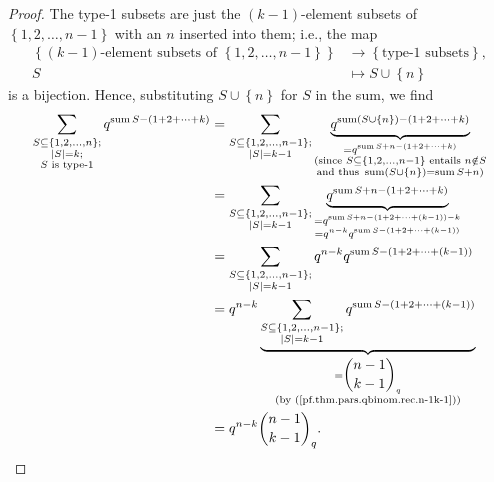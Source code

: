 \begin{proof}
The type-1 subsets are just the $\left(  k-1\right)  $-element subsets of
$\left\{  1,2,\ldots,n-1\right\}  $ with an $n$ inserted into them; i.e., the
map%
\begin{align*}
\left\{  \left(  k-1\right)  \text{-element subsets of }\left\{
1,2,\ldots,n-1\right\}  \right\}   &  \rightarrow\left\{  \text{type-1
subsets}\right\}  ,\\
S  &  \mapsto S\cup\left\{  n\right\}
\end{align*}
is a bijection. Hence, substituting $S\cup\left\{  n\right\}  $ for $S$ in the
sum, we find%
\begin{align*}
\sum_{\substack{S\subseteq\left\{  1,2,\ldots,n\right\}  ;\\\left\vert
S\right\vert =k;\\S\text{ is type-1}}}q^{\operatorname*{sum}S-\left(
1+2+\cdots+k\right)  }  &  =\sum_{\substack{S\subseteq\left\{  1,2,\ldots
,n-1\right\}  ;\\\left\vert S\right\vert =k-1}%
}\underbrace{q^{\operatorname*{sum}\left(  S\cup\left\{  n\right\}  \right)
-\left(  1+2+\cdots+k\right)  }}_{\substack{=q^{\operatorname*{sum}S+n-\left(
1+2+\cdots+k\right)  }\\\text{(since }S\subseteq\left\{  1,2,\ldots
,n-1\right\}  \text{ entails }n\notin S\\\text{and thus }\operatorname*{sum}%
\left(  S\cup\left\{  n\right\}  \right)  =\operatorname*{sum}S+n\text{)}}}\\
&  =\sum_{\substack{S\subseteq\left\{  1,2,\ldots,n-1\right\}  ;\\\left\vert
S\right\vert =k-1}}\underbrace{q^{\operatorname*{sum}S+n-\left(
1+2+\cdots+k\right)  }}_{\substack{=q^{\operatorname*{sum}S+n-\left(
1+2+\cdots+\left(  k-1\right)  \right)  -k}\\=q^{n-k}q^{\operatorname*{sum}%
S-\left(  1+2+\cdots+\left(  k-1\right)  \right)  }}}\\
&  =\sum_{\substack{S\subseteq\left\{  1,2,\ldots,n-1\right\}  ;\\\left\vert
S\right\vert =k-1}}q^{n-k}q^{\operatorname*{sum}S-\left(  1+2+\cdots+\left(
k-1\right)  \right)  }\\
&  =q^{n-k}\underbrace{\sum_{\substack{S\subseteq\left\{  1,2,\ldots
,n-1\right\}  ;\\\left\vert S\right\vert =k-1}}q^{\operatorname*{sum}S-\left(
1+2+\cdots+\left(  k-1\right)  \right)  }}_{\substack{=\dbinom{n-1}{k-1}%
_{q}\\\text{(by (\ref{pf.thm.pars.qbinom.rec.n-1k-1}))}}}\\
&  =q^{n-k}\dbinom{n-1}{k-1}_{q}.
\end{align*}



\end{proof}
